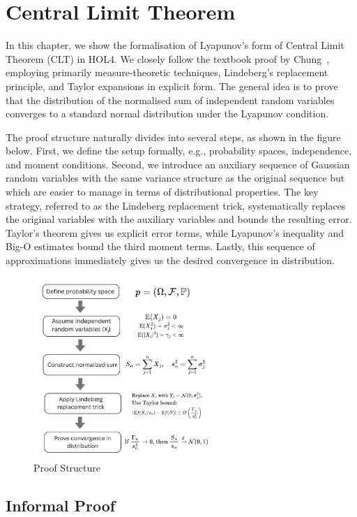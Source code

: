 \chapter{Central Limit Theorem}
\label{ch:clt}

In this chapter, we show the formalisation of Lyapunov's form of Central Limit Theorem (CLT) in HOL4. We closely follow the textbook proof by Chung~\cite{Chung:2001}, employing primarily measure-theoretic techniques, Lindeberg's replacement principle, and Taylor expansions in explicit form. The general idea is to prove that the distribution of the normalised sum of independent random variables converges to a standard normal distribution under the Lyapunov condition.

The proof structure naturally divides into several steps, as shown in the figure below. First, we define the setup formally, e.g., probability spaces, independence, and moment conditions. Second, we introduce an auxiliary sequence of Gaussian random variables with the same variance structure as the original sequence but which are easier to manage in terms of distributional properties. The key strategy, referred to as the Lindeberg replacement trick, systematically replaces the original variables with the auxiliary variables and bounds the resulting error. Taylor's theorem gives us explicit error terms, while Lyapunov's inequality and Big-O estimates bound the third moment terms. Lastly, this sequence of approximations immediately gives us the desired convergence in distribution.

\begin{figure}[h!]
  \caption{Proof Structure}
  \includegraphics[width=7cm]{./img/method.png}
  \centering
\end{figure}

\section {Informal Proof}

